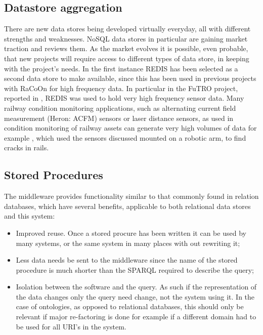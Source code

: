 \subsection{Datastore aggregation}
There are new data stores being developed virtually everyday, all with different strengths and weaknesses. NoSQL data stores in particular are gaining market traction and \citet{Moniruzzaman2013} reviews them. As the market evolves it is possible, even probable, that new projects will require access to different types of data store, in keeping with the project's needs. In the first instance REDIS has been selected as a second data store to make available, since this has been used in previous projects with RaCoOn for high frequency data. In particular in the FuTRO project, reported in \cite{Tutcher2013}, REDIS was used to hold very high frequency sensor data. Many railway condition monitoring applications, such as alternating current field measurement (Heron: ACFM) sensors or laser distance sensors, as used in condition monitoring of railway assets can generate very high volumes of data for example \citet{Rowshandel2013}, which used the sensors discussed mounted on a robotic arm, to find cracks in rails. 

\subsection{Stored Procedures}
The middleware provides  functionality similar to that commonly found in relation databases, which have several benefits, applicable to both relational data stores and this system:

\begin{itemize}
    \item Improved reuse. Once a stored procure has been written it can be used by many systems, or the same system in many places with out rewriting it;
    \item Less data needs be sent to the middleware since the name of the stored procedure is much shorter than the SPARQL required to describe the query; 
    \item Isolation between the software and the query. As such if the representation of the data changes only the query need change, not the system using it. In the case of ontologies, as opposed to relational databases, this should only be relevant if major re-factoring is done for example if a different domain had to be used for all URI's in the system.
\end{itemize}

